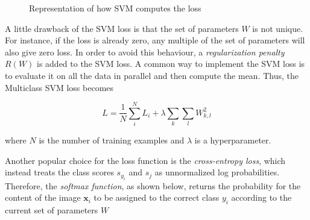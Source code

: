 \documentclass[12pt,a4paper]{report}
\theoremstyle{definition}
\begin{document}
\begin{figure}[h]
    \caption{Representation of how SVM computes the loss}
    \label{fig:SVM}
\end{figure}

A little drawback of the SVM loss is that the set of parameters $W$ is not unique. For instance, if the loss is already zero, any multiple of the set of parameters will also give zero loss. In order to avoid this behaviour, a \emph{regularization penalty $R \left( W \right)$} is added to the SVM loss. A common way to implement the SVM loss is to evaluate it on all the data in parallel and then compute the mean. Thus, the Multiclass SVM loss becomes

\begin{equation}
    L = \frac{1}{N}\sum_i^N L_i + \lambda \sum_k \sum_l W_{k,l}^2
    \label{eq:loss_mean}
\end{equation}

where $N$ is the number of training examples and $\lambda$ is a hyperparameter.

Another popular choice for the loss function is the \emph{cross-entropy loss}, which instead treats the class scores $s_{y_i}$ and $s_j$ as unnormalized log probabilities. Therefore, the \emph{softmax function}, as shown below, returns the probability for the content of the image $\textbf{x}_i$ to be assigned to the correct class $y_i$ according to the current set of parameters $W$
\end{document}
